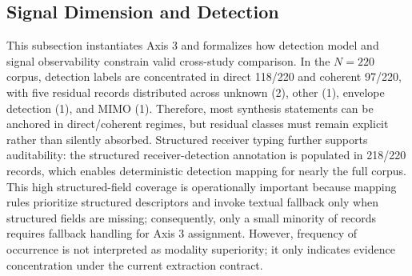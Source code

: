 \documentclass[lettersize,journal]{IEEEtran}
\begin{document}
\subsection{Signal Dimension and Detection}
This subsection instantiates Axis 3 and formalizes how detection model and signal observability constrain valid cross-study comparison. In the $N=220$ corpus, detection labels are concentrated in direct 118/220 and coherent 97/220, with five residual records distributed across unknown (2), other (1), envelope detection (1), and MIMO (1). Therefore, most synthesis statements can be anchored in direct/coherent regimes, but residual classes must remain explicit rather than silently absorbed. Structured receiver typing further supports auditability: the structured receiver-detection annotation is populated in 218/220 records, which enables deterministic detection mapping for nearly the full corpus. This high structured-field coverage is operationally important because mapping rules prioritize structured descriptors and invoke textual fallback only when structured fields are missing; consequently, only a small minority of records requires fallback handling for Axis 3 assignment. However, frequency of occurrence is not interpreted as modality superiority; it only indicates evidence concentration under the current extraction contract.
\end{document}
